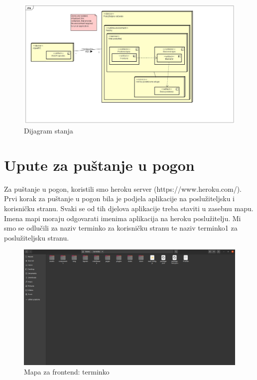 			\begin{figure}[H]
				\includegraphics[width=1\linewidth]{slike/dijagram-razmjestaja.jpg}
				\centering
				\caption{Dijagram stanja}
				\label{fig:dijagram_razmjestaja}
			\end{figure}
			\eject 
		
		\section{Upute za puštanje u pogon}
		
			Za puštanje u pogon, koristili smo heroku server (https://www.heroku.com/). Prvi korak za puštanje u pogon bila je podjela aplikacije na poslužiteljsku i korisničku stranu. Svaki se od tih djelova aplikacije treba staviti u zasebnu mapu. Imena mapi moraju odgovarati imenima aplikacija na heroku poslužitelju. Mi smo se odlučili za naziv terminko za korisničku stranu te naziv terminko1 za poslužiteljsku stranu.
			
			\begin{figure}[H]
				\centering
				\includegraphics[scale=0.25]{slike/FrontendMapa.PNG}
				\caption{Mapa za frontend: terminko}
				\label{fig:promjene}
			\end{figure}
			
